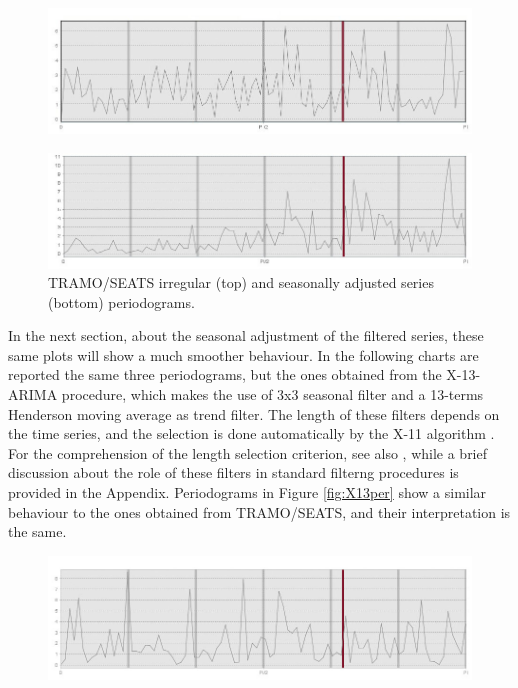 \documentclass[english,blauw]{cbsdiscussionpaper}
\begin{document}
\begin{figure}[h]
\includegraphics[width=\linewidth]{../images/capitolo3/perIRR.jpg}
\end{figure}
\begin{figure}[h]
\includegraphics[width=\linewidth]{../images/capitolo3/perSA.jpg}
\caption{TRAMO/SEATS irregular (top) and seasonally adjusted series (bottom) periodograms.}
\label{fig:perIRRSA}
\end{figure}
In the next section, about the seasonal adjustment of the filtered series, these same plots will show a much smoother behaviour. In the following charts are reported the same three periodograms, but the ones obtained from the X-13-ARIMA procedure, which makes the use of 3x3 seasonal filter and a 13-terms Henderson moving average as trend filter. The length of these filters depends on the time series, and the selection is done automatically by the X-11 algorithm \citep{dageal1996}. For the comprehension of the length selection criterion, see also \citep{gru2015}, while a brief discussion about the role of these filters in standard filterng procedures is provided in the Appendix. Periodograms in Figure \ref{fig:X13per} show a similar behaviour to the ones obtained from TRAMO/SEATS, and their interpretation is the same. 
\begin{figure}[h]
\includegraphics[width=\linewidth]{../images/capitolo3/XperRES.jpg} 
\end{figure}
\end{document}
